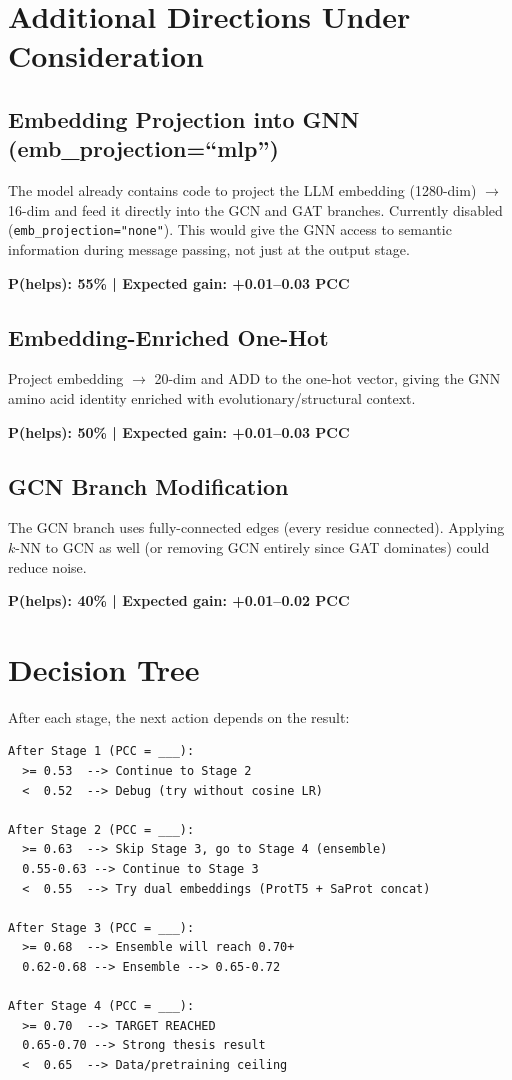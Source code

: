 \section{Additional Directions Under Consideration}

\subsection{Embedding Projection into GNN (emb\_projection=``mlp'')}

The model already contains code to project the LLM embedding (1280-dim) $\rightarrow$ 16-dim and feed it directly into the GCN and GAT branches. Currently disabled (\texttt{emb\_projection="none"}). This would give the GNN access to semantic information during message passing, not just at the output stage.

\textbf{P(helps): 55\% | Expected gain: +0.01--0.03 PCC}

\subsection{Embedding-Enriched One-Hot}

Project embedding $\rightarrow$ 20-dim and ADD to the one-hot vector, giving the GNN amino acid identity enriched with evolutionary/structural context.

\textbf{P(helps): 50\% | Expected gain: +0.01--0.03 PCC}

\subsection{GCN Branch Modification}

The GCN branch uses fully-connected edges (every residue connected). Applying $k$-NN to GCN as well (or removing GCN entirely since GAT dominates) could reduce noise.

\textbf{P(helps): 40\% | Expected gain: +0.01--0.02 PCC}

\section{Decision Tree}

After each stage, the next action depends on the result:

\begin{verbatim}
After Stage 1 (PCC = ___):
  >= 0.53  --> Continue to Stage 2
  <  0.52  --> Debug (try without cosine LR)

After Stage 2 (PCC = ___):
  >= 0.63  --> Skip Stage 3, go to Stage 4 (ensemble)
  0.55-0.63 --> Continue to Stage 3
  <  0.55  --> Try dual embeddings (ProtT5 + SaProt concat)

After Stage 3 (PCC = ___):
  >= 0.68  --> Ensemble will reach 0.70+
  0.62-0.68 --> Ensemble --> 0.65-0.72

After Stage 4 (PCC = ___):
  >= 0.70  --> TARGET REACHED
  0.65-0.70 --> Strong thesis result
  <  0.65  --> Data/pretraining ceiling
\end{verbatim}

